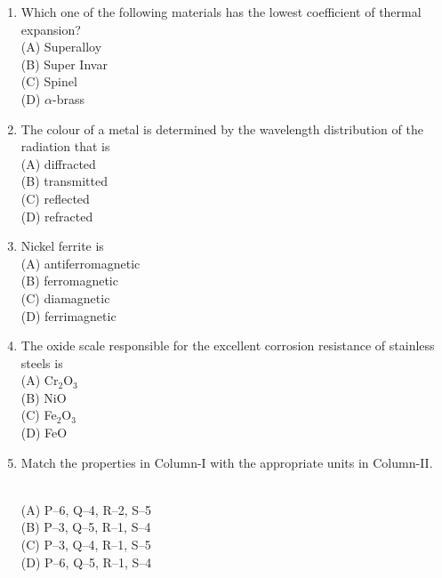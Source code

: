 \documentclass[journal,12pt,onecolumn]{IEEEtran}
\begin{document}
\begin{enumerate}
\item Which one of the following materials has the lowest coefficient of thermal expansion?
\vspace{0.2cm}
\hfill{}\\
(A) Superalloy \\
(B) Super Invar \\
(C) Spinel \\
(D) $\alpha$-brass
\vspace{0.5cm}

\item The colour of a metal is determined by the wavelength distribution of the radiation that is
\vspace{0.2cm}
\hfill{}\\
(A) diffracted \\
(B) transmitted \\
(C) reflected \\
(D) refracted

\newpage

\item Nickel ferrite is
\vspace{0.2cm}
\hfill{}\\
(A) antiferromagnetic \\
(B) ferromagnetic \\
(C) diamagnetic \\
(D) ferrimagnetic
\vspace{0.5cm}

\item The oxide scale responsible for the excellent corrosion resistance of stainless steels is
\vspace{0.2cm}
\hfill{}\\
(A) Cr$_2$O$_3$ \\
(B) NiO \\
(C) Fe$_2$O$_3$ \\
(D) FeO
\vspace{0.5cm}

\item Match the properties in Column-I with the appropriate units in Column-II.
\vspace{0.2cm}


\hfill{}\\
(A) P–6, Q–4, R–2, S–5 \\
(B) P–3, Q–5, R–1, S–4 \\
(C) P–3, Q–4, R–1, S–5 \\
(D) P–6, Q–5, R–1, S–4
\vspace{0.5cm}


\end{enumerate}
\end{document}
